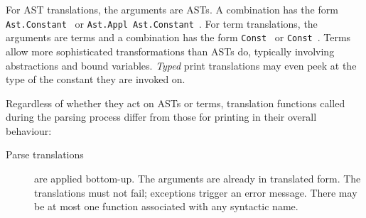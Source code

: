 \begin{isabellebody}
\begin{isamarkuptext}
  For AST translations, the arguments  are ASTs.  A
  combination has the form \verb|Ast.Constant|~ or \verb|Ast.Appl|~\verb|Ast.Constant|~.
  For term translations, the arguments are terms and a combination has
  the form \verb|Const|~ or \verb|Const|~.  Terms allow more sophisticated transformations
  than ASTs do, typically involving abstractions and bound
  variables. \emph{Typed} print translations may even peek at the type
   of the constant they are invoked on.

  Regardless of whether they act on ASTs or terms, translation
  functions called during the parsing process differ from those for
  printing in their overall behaviour:

  \begin{description}

  \item [Parse translations] are applied bottom-up.  The arguments are
  already in translated form.  The translations must not fail;
  exceptions trigger an error message.  There may be at most one
  function associated with any syntactic name.


\end{description}
\end{isamarkuptext}
\end{isabellebody}
